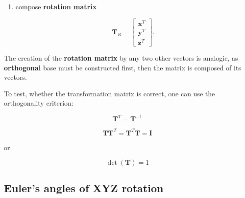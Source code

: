 \begin{enumerate}
\begin{bbox}[0.85]
\begin{enumerate}
                \item compose \textbf{rotation matrix}

                    \begin{equation}
                        \mathbf{T}_{R} = \begin{bmatrix}
                            \mathbf{x}^{T} \\
                            \mathbf{y}^{T} \\
                            \mathbf{z}^{T}
                        \end{bmatrix}
                    .\end{equation}
            \end{enumerate}

            The creation of the \textbf{rotation matrix} by any two other vectors is
            analogic, as \textbf{orthogonal} base must be constructed first, then
            the matrix is composed of its vectors.
        \end{bbox}

        \begin{bbox}[0.85]

            To test, whether the transformation matrix is correct, one can use
            the orthogonality criterion:

            \begin{equation}
                \mathbf{T}^{T} = \mathbf{T}^{-1}
            \end{equation}

            \begin{equation}
                \mathbf{T}\mathbf{T}^{T} = \mathbf{T}^{T}\mathbf{T} = \mathbf{I}
            \end{equation}

            or

            \begin{equation}
                \det(\mathbf{T}) = 1
            \end{equation}

        \end{bbox}

\end{enumerate}



\subsection{Euler's angles of \textbf{XYZ} rotation}

